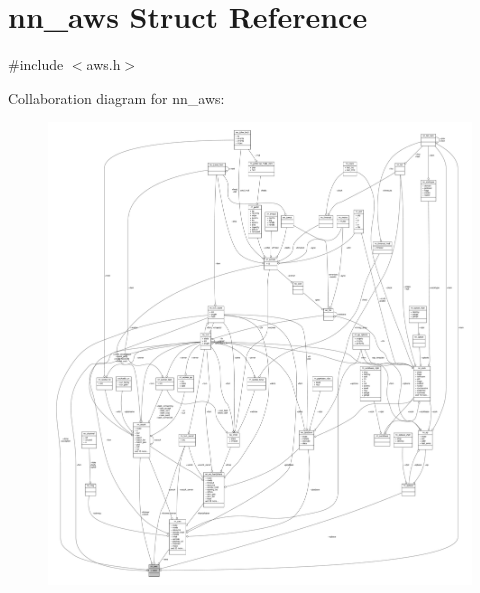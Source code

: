 \hypertarget{structnn__aws}{}\section{nn\+\_\+aws Struct Reference}
\label{structnn__aws}


{\ttfamily \#include $<$aws.\+h$>$}



Collaboration diagram for nn\+\_\+aws\+:\nopagebreak
\begin{figure}[H]
\begin{center}
\leavevmode
\includegraphics[width=350pt]{structnn__aws__coll__graph}
\end{center}
\end{figure}
